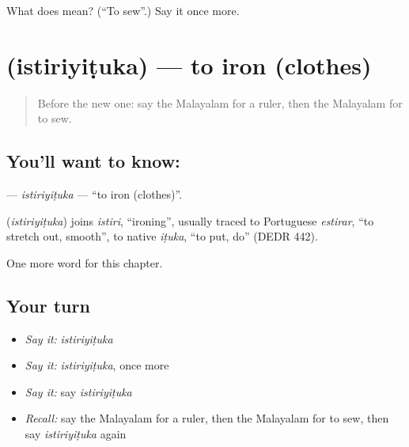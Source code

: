 \begin{tcolorbox}[breakable,colback=teal!4,colframe=teal!35!black,title={Before you move on}]
What does  mean? (\textquotedblleft{}To sew\textquotedblright{}.) Say it once more.
\end{tcolorbox}
\section[\texorpdfstring{\ml{ഇസ്തിരിയിടുക} (istiriyiṭuka)}{ഇസ്തിരിയിടുക (istiriyiṭuka)}]{ (istiriyiṭuka) — to iron (clothes)}

\label{lesson:ML-C302-istiriyituka}



\begin{quote}
Before the new one: say the Malayalam for a ruler, then the Malayalam for to sew.
\end{quote}

\subsection*{You'll want to know: }
\textbf{} — \emph{istiriyiṭuka} — \textquotedblleft{}to iron (clothes)\textquotedblright{}.

\begin{cousinweb}
\textbf{} (\emph{istiriyiṭuka}) joins \emph{istiri}, \textquotedblleft{}ironing\textquotedblright{}, usually traced to Portuguese \emph{estirar}, \textquotedblleft{}to stretch out, smooth\textquotedblright{}, to native \emph{iṭuka}, \textquotedblleft{}to put, do\textquotedblright{} (DEDR 442).
\end{cousinweb}

\begin{grammarlens}[title={What you've built}]
One more word for this chapter.
\end{grammarlens}

\subsection*{Your turn}
\begin{itemize}
\raggedright
  \item \emph{Say it:} \emph{istiriyiṭuka}
  \item \emph{Say it:} \emph{istiriyiṭuka}, once more
  \item \emph{Say it:} say \emph{istiriyiṭuka}
  \item \emph{Recall:} say the Malayalam for a ruler, then the Malayalam for to sew, then say \emph{istiriyiṭuka} again
\end{itemize}

